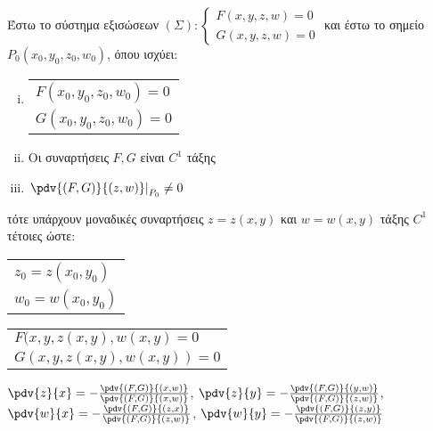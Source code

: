       Έστω το σύστημα εξισώσεων $(\Sigma):
      \begin{cases}
        F(x,y,z,w) = 0  \\
        G(x,y,z,w) = 0
      \end{cases}$
      και έστω το σημείο $ P_0(x_0,y_0,z_0,w_0) $, όπου ισχύει:
      \begin{enumerate}[(i)]
        \item  \begin{tabular}{l}
            $F(x_0,y_0,z_0,w_0) = 0$ \\
            $G(x_0,y_0,z_0,w_0) = 0$
          \end{tabular}
        \item Οι συναρτήσεις $ F, G $ είναι $ C^{1} $ τάξης 
        \item $ \left.\pdv{(F,G)}{(z,w)}\right|_{P_0} \neq 0 $ 
        \end{enumerate}
        τότε υπάρχουν μοναδικές συναρτήσεις $ z = z(x,y) $ και $ w = w(x,y) $ τάξης 
        $ C^{1} $ τέτοιες ώστε:
        \begin{myitemize}
          \item \begin{tabular}{l}
              $ z_0 = z(x_0,y_0) $ \\
              $ w_0 = w(x_0,y_0) $
            \end{tabular}
          \item \begin{tabular}{l}
              $ F(x,y,z(x,y), w(x,y) = 0 $ \\
              $ G(x,y,z(x,y), w(x,y)) = 0 $
            \end{tabular}
          \item $ \pdv{z}{x} = - \frac{\pdv{(F,G)}{(x,w)}}{\pdv{(F,G)}{(x,w)}} $, 
            $ \pdv{z}{y} = -
            \frac{\pdv{(F,G)}{(y,w)}}{\pdv{(F,G)}{(z,w)}} $, $ \pdv{w}{x} = -
            \frac{\pdv{(F,G)}{(z,x)}}{\pdv{(F,G)}{(z,w)}} $, $ \pdv{w}{y} = -
            \frac{\pdv{(F,G)}{(z,y)}}{\pdv{(F,G)}{(z,w)}} $
        \end{myitemize}

